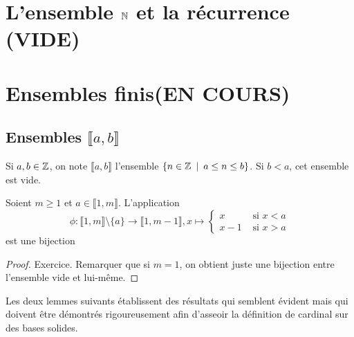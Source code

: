 
\section{L'ensemble $\mathbb{N}$ et la récurrence (VIDE)}

\section{Ensembles finis(EN COURS)}

\subsection{Ensembles $\llbracket a,b\rrbracket$}

Si $a, b\in \mathbb{Z}$, on note $\llbracket a,b\rrbracket$ l'ensemble $\{n\in \mathbb{Z}\:\mid\: a\leq n \leq b\}$. Si $b<a$, cet ensemble est vide.

\begin{lemme} Soient $m\geq 1$ et $a\in \llbracket 1,m\rrbracket$. L'application 
\[
\phi : \llbracket 1,m\rrbracket \setminus \{a\} \to \llbracket 1,m-1\rrbracket, 
x\mapsto \begin{cases}x & \text{ si }x<a\\x-1 & \text{ si }x>a\end{cases}
\]
est une bijection
\end{lemme}
\begin{proof} Exercice. Remarquer que si $m=1$, on obtient juste une bijection entre l'ensemble vide et lui-même.
\end{proof}


Les deux lemmes suivants établissent des résultats qui semblent \og évident\fg{} mais qui doivent être démontrés rigoureusement afin d'asseoir la définition de cardinal sur des bases solides.

